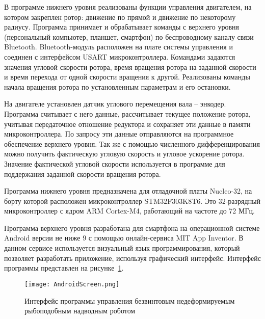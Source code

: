 В программе нижнего уровня реализованы функции управления двигателем, на котором закреплен ротор: движение по прямой и движение по некоторому радиусу. Программа принимает и обрабатывает команды с верхнего уровня (персональный компьютер, планшет, смартфон) по беспроводному каналу связи Bluetooth. Bluetooth-модуль расположен на плате системы управления и соединен с интерфейсом USART микроконтроллера. Командами задаются значения угловой скорости ротора, время вращения ротора на заданной скорости и время перехода от одной скорости вращения к другой. Реализованы команды начала вращения ротора по установленным параметрам и его остановки.

На двигателе установлен датчик углового перемещения вала – энкодер. Программа считывает с него данные, рассчитывает текущее положение ротора, учитывая передаточное отношение редуктора и сохраняет эти данные в памяти микроконтроллера. По запросу эти данные отправляются на программное обеспечение верхнего уровня. Так же с помощью численного дифференцирования можно получить фактическую угловую скорость и угловое ускорение ротора. Значение фактической угловой скорости используется в программе для поддержания заданной скорости вращения ротора.

Программа нижнего уровня предназначена для отладочной платы Nucleo-32, на борту которой расположен микроконтроллер STM32F303K8T6. Это 32-разрядный микроконтроллер с ядром ARM Cortex-M4, работающий на частоте до 72 МГц.

Программа верхнего уровня разработана для смартфона на операционной системе Android версии не ниже 9 с помощью онлайн-сервиса MIT App Inventor. В данном сервисе используется визуальный язык программирования, который позволяет разработать приложение, используя графический интерфейс. Интерфейс программы представлен на рисунке~\ref{AndroidScreen}.



\begin{figure}[!h]
	\centering
	\texttt{[image: AndroidScreen.png]}
	\caption{Интерфейс программы управления безвинтовым недеформируемым рыбоподобным надводным роботом}
	\label{AndroidScreen}
\end{figure}

